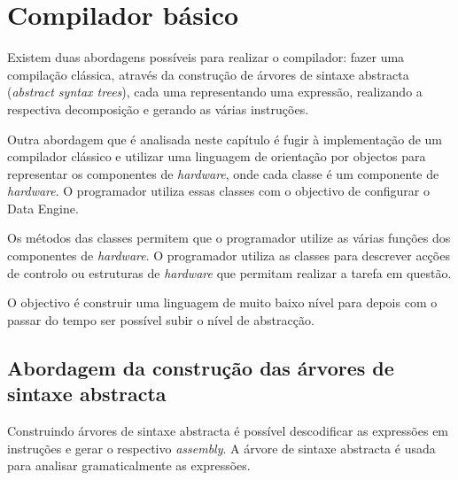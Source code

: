 
\chapter{Compilador básico}
\label{chapter:Compilador basico}

Existem duas abordagens possíveis para realizar o compilador: fazer uma compilação clássica, através da construção de árvores de sintaxe abstracta ({\it abstract syntax trees}), cada uma representando uma expressão, realizando a respectiva decomposição e gerando as várias instruções. 

Outra abordagem que é analisada neste capítulo é fugir à implementação de um compilador clássico e utilizar uma linguagem de orientação por objectos para representar os componentes de {\it hardware}, onde cada classe é um componente de {\it hardware}. 
O programador utiliza essas classes com o objectivo de configurar o Data Engine.

Os métodos das classes permitem que o programador utilize as várias funções dos componentes de {\it hardware}. O programador utiliza as classes para descrever acções de controlo ou estruturas de {\it hardware} que permitam realizar a tarefa em questão.

O objectivo é construir uma linguagem de muito baixo nível para depois com o passar do tempo ser possível subir o nível de abstracção. 


\section{Abordagem da construção das árvores de sintaxe abstracta}
\label{section:Abordagem da construcao das arvores de sintaxe abstracta}

Construindo árvores de sintaxe abstracta é possível descodificar as expressões em instruções e gerar o respectivo {\it assembly}. A árvore de sintaxe abstracta é usada para analisar gramaticalmente as expressões. 


